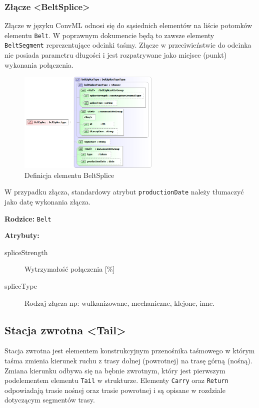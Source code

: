 \documentclass[12pt,a4paper]{article}
\begin{document}
\subsubsection{Złącze <BeltSplice>}
Złącze w języku ConvML odnosi się do sąsiednich elementów na liście potomków
elementu {\tt Belt}.  W poprawnym dokumencie będą to zawsze elementy {\tt
  BeltSegment} reprezentujące odcinki taśmy.  Złącze w przeciwieństwie do
odcinka nie posiada parametru długości i jest rozpatrywane jako miejsce (punkt)
wykonania połączenia.

\begin{figure}[H]
  \centering
  \includegraphics[width=0.6\textwidth]{png/liquid/BeltSplice}
  \caption{Definicja elementu BeltSplice}
  \label{fig:beltSplice-xsd}
\end{figure}

W przypadku złącza, standardowy atrybut {\tt productionDate} należy tłumaczyć
jako datę wykonania złącza.

\noindent\textbf{Rodzice:} \texttt{Belt}

\noindent\textbf{Atrybuty:}
\begin{description}
\item[spliceStrength] Wytrzymałość połączenia [\%]
\item[spliceType] Rodzaj złącza np: wulkanizowane, mechaniczne, klejone, inne.
\end{description}


\subsection{Stacja zwrotna <Tail>}
Stacja zwrotna jest elementem konstrukcyjnym przenośnika taśmowego w którym
taśma zmienia kierunek ruchu z trasy dolnej (powrotnej) na trasę górną (nośną).
Zmiana kierunku odbywa się na bębnie zwrotnym, który jest pierwszym podelementem
elementu {\tt Tail} w strukturze.  Elementy {\tt Carry} oraz {\tt Return}
odpowiadają trasie nośnej oraz trasie powrotnej i są opisane w rozdziale
dotyczącym segmentów trasy.
\end{document}
